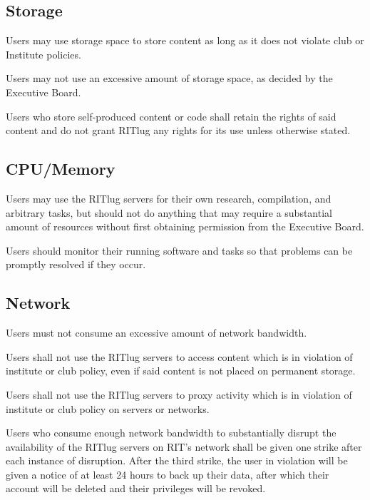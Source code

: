 \subsection{Storage}
\begin{subroutines}
\item Users may use storage space to store content as long as it does not violate club or Institute policies.
\item Users may not use an excessive amount of storage space, as decided by the Executive Board.
\item Users who store self-produced content or code shall retain the rights of said content and do not grant RITlug any rights for its use unless otherwise stated.
\end{subroutines}

\subsection{CPU/Memory}
\begin{subroutines}
\item Users may use the RITlug servers for their own research, compilation, and arbitrary tasks, but should not do anything that may require a substantial amount of resources without first obtaining permission from the Executive Board.
\item Users should monitor their running software and tasks so that problems can be promptly resolved if they occur.
\end{subroutines}

\subsection{Network}
\begin{subroutines}
\item Users must not consume an excessive amount of network bandwidth.
\item Users shall not use the RITlug servers to access content which is in violation of institute or club policy, even if said content is not placed on permanent storage.
\item Users shall not use the RITlug servers to proxy activity which is in violation of institute or club policy on servers or networks.
\item Users who consume enough network bandwidth to substantially disrupt the availability of the RITlug servers on RIT's network shall be given one strike after each instance of disruption. After the third strike, the user in violation will be given a notice of at least 24 hours to back up their data, after which their account will be deleted and their privileges will be revoked.
\end{subroutines}

